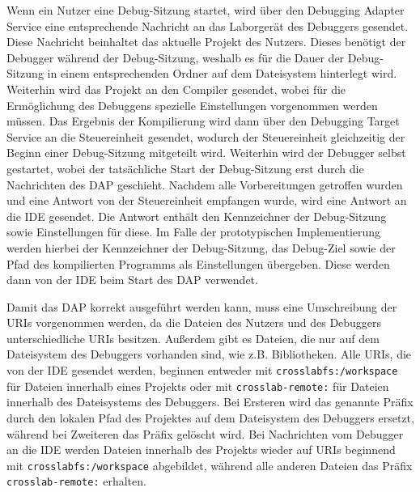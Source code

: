 Wenn ein Nutzer eine Debug-Sitzung startet, wird über den Debugging Adapter Service eine entsprechende Nachricht an das Laborgerät des Debuggers gesendet. Diese Nachricht beinhaltet das aktuelle Projekt des Nutzers. Dieses benötigt der Debugger während der Debug-Sitzung, weshalb es für die Dauer der Debug-Sitzung in einem entsprechenden Ordner auf dem Dateisystem hinterlegt wird. Weiterhin wird das Projekt an den Compiler gesendet, wobei für die Ermöglichung des Debuggens spezielle Einstellungen vorgenommen werden müssen. Das Ergebnis der Kompilierung wird dann über den Debugging Target Service an die Steuereinheit gesendet, wodurch der Steuereinheit gleichzeitig der Beginn einer Debug-Sitzung mitgeteilt wird. Weiterhin wird der Debugger selbst gestartet, wobei der tatsächliche Start der Debug-Sitzung erst durch die Nachrichten des \ac{DAP} geschieht. Nachdem alle Vorbereitungen getroffen wurden und eine Antwort von der Steuereinheit empfangen wurde, wird eine Antwort an die IDE gesendet. Die Antwort enthält den Kennzeichner der Debug-Sitzung sowie Einstellungen für diese. Im Falle der prototypischen Implementierung werden hierbei der Kennzeichner der Debug-Sitzung, das Debug-Ziel sowie der Pfad des kompilierten Programms als Einstellungen übergeben. Diese werden dann von der IDE beim Start des \ac{DAP} verwendet.

Damit das \ac{DAP} korrekt ausgeführt werden kann, muss eine Umschreibung der URIs vorgenommen werden, da die Dateien des Nutzers und des Debuggers unterschiedliche URIs besitzen. Außerdem gibt es Dateien, die nur auf dem Dateisystem des Debuggers vorhanden sind, wie z.B. Bibliotheken. Alle URIs, die von der IDE gesendet werden, beginnen entweder mit \texttt{crosslabfs:/workspace} für Dateien innerhalb eines Projekts oder mit \texttt{crosslab-remote:} für Dateien innerhalb des Dateisystems des Debuggers. Bei Ersteren wird das genannte Präfix durch den lokalen Pfad des Projektes auf dem Dateisystem des Debuggers ersetzt, während bei Zweiteren das Präfix gelöscht wird. Bei Nachrichten vom Debugger an die IDE werden Dateien innerhalb des Projekts wieder auf URIs beginnend mit \texttt{crosslabfs:/workspace} abgebildet, während alle anderen Dateien das Präfix \texttt{crosslab-remote:} erhalten.

